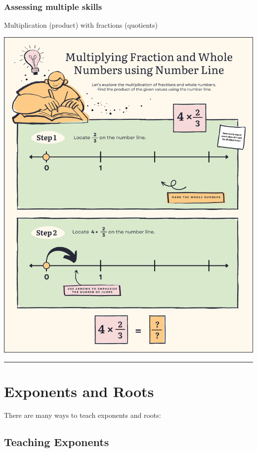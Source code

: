 \documentclass[
  letterpaper,
  DIV=11,
  numbers=noendperiod]{scrartcl}
\begin{document}
\subsubsection{Assessing multiple
skills}\label{assessing-multiple-skills}

Multiplication (product) with fractions (quotients)

\includegraphics{../img/mod03/multiplying-fractions.jpg}

\begin{center}\rule{0.5\linewidth}{0.5pt}\end{center}

\section{Exponents and Roots}\label{exponents-and-roots}

There are many ways to teach exponents and roots:

\subsection{Teaching Exponents}\label{teaching-exponents}
\end{document}
